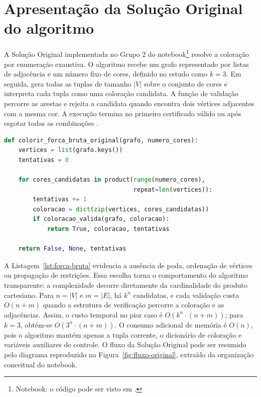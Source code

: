 \section{Apresentação da Solução Original do algoritmo}\label{sec:secao_AlgoritmoOriginal}

A Solução Original implementada no Grupo 2 do notebook\footnote{Notebook: o código pode ser visto em \parencite{dalton-reisUDESC_PAA_TFMainipynb}.} resolve a coloração por enumeração exaustiva. O algoritmo recebe um grafo representado por listas de adjacência e um número fixo de cores, definido no estudo como $k=3$. Em seguida, gera todas as tuplas de tamanho $|V|$ sobre o conjunto de cores e interpreta cada tupla como uma coloração candidata. A função de validação percorre as arestas e rejeita a candidata quando encontra dois vértices adjacentes com a mesma cor. A execução termina no primeiro certificado válido ou após esgotar todas as combinações \parencite{dalton-reisUDESC_PAA_TFMainipynb}.

\begin{lstlisting}[language=Python, caption={Núcleo da Solução Original por força bruta}, label={lst:forca-bruta}]
def colorir_forca_bruta_original(grafo, numero_cores):
    vertices = list(grafo.keys())
    tentativas = 0

    for cores_candidatas in product(range(numero_cores),
                                    repeat=len(vertices)):
        tentativas += 1
        coloracao = dict(zip(vertices, cores_candidatas))
        if coloracao_valida(grafo, coloracao):
            return True, coloracao, tentativas

    return False, None, tentativas
\end{lstlisting}

A Listagem~\ref{lst:forca-bruta} evidencia a ausência de poda, ordenação de vértices ou propagação de restrições. Essa escolha torna o comportamento do algoritmo transparente: a complexidade decorre diretamente da cardinalidade do produto cartesiano. Para $n=|V|$ e $m=|E|$, há $k^n$ candidatas, e cada validação custa $O(n+m)$ quando a estrutura de verificação percorre a coloração e as adjacências. Assim, o custo temporal no pior caso é $O(k^n\cdot(n+m))$; para $k=3$, obtém-se $O(3^n\cdot(n+m))$. O consumo adicional de memória é $O(n)$, pois o algoritmo mantém apenas a tupla corrente, o dicionário de coloração e variáveis auxiliares de controle. O fluxo da Solução Original pode ser resumido pelo diagrama reproduzido na Figura~\ref{fig:fluxo-original}, extraído da organização conceitual do notebook.

